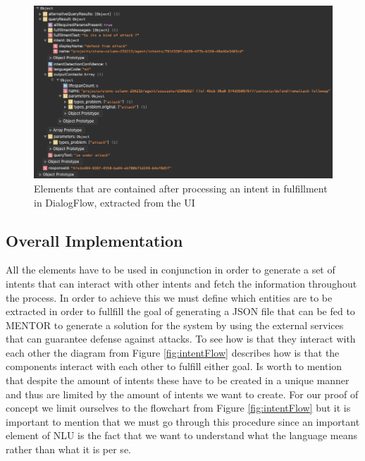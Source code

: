\begin{figure}[!h]
    \centering
    \includegraphics[scale=0.50]{MA-BA-Thesis/responseElements.png}
    \caption{Elements that are contained after processing an intent in fulfillment in DialogFlow, extracted from the UI}
    \label{fig:responseArray}
\end{figure}


\subsection{Overall Implementation}

All the elements have to be used in conjunction in order to generate a set of intents that can interact with other intents and fetch the information throughout the process. In order to achieve this we must define which entities are to be extracted in order to fullfill the goal of generating a JSON file that can be fed to MENTOR \cite{MENTOR} to generate a solution for the system by using the external services that can guarantee defense against attacks. To see how is that they interact with each other the diagram from Figure \ref{fig:intentFlow} describes how is that the components interact with each other to fulfill either goal. Is worth to mention that despite the amount of intents these have to be created in a unique manner and thus are limited by the amount of intents we want to create. For our proof of concept we limit ourselves to the flowchart from Figure \ref{fig:intentFlow} but it is important to mention that we must go through this procedure since an important element of NLU is the fact that we want to understand what the language means rather than what it is per se.

